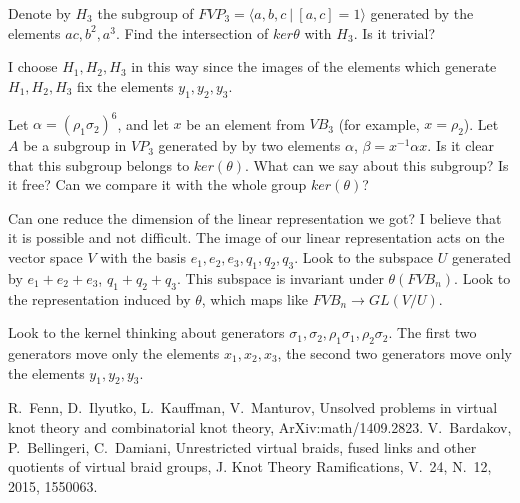 \documentclass{article}
\begin{document}
Denote by $H_3$ the subgroup of $FVP_3=\langle a,b,c~|~[a,c]=1\rangle$ generated by the elements $ac,b^2,a^3$. Find the intersection of $ker{\theta}$ with $H_3$. Is it trivial?

I choose $H_1,H_2,H_3$ in this way since the images of the elements which generate $H_1,H_2,H_3$ fix the elements $y_1,y_2,y_3$. 

Let $\alpha=(\rho_1\sigma_2)^6$, and let $x$ be an element from $VB_3$ (for example, $x=\rho_2$). Let $A$ be a subgroup in $VP_3$ generated by by two elements $\alpha$, $\beta=x^{-1}\alpha x$. Is it clear that this subgroup belongs to $ker(\theta)$. What can we say about this subgroup? Is it free? Can we compare it with the whole group $ker(\theta)$?

Can one reduce the dimension of the linear representation we got? I believe that it is possible and not difficult. The image of our linear representation acts on the vector space $V$ with the basis $e_1,e_2,e_3,q_1,q_2,q_3$. Look to the subspace $U$ generated by $e_1+e_2+e_3$, $q_1+q_2+q_3$. This subspace is invariant under $\theta(FVB_n)$. Look to the representation induced by $\theta$, which maps like $FVB_n\to GL(V/U)$.

Look to the kernel thinking about generators $\sigma_1, \sigma_2, \rho_1\sigma_1,\rho_2\sigma_2$. The first two generators move only the elements $x_1,x_2,x_3$, the second two generators move only the elements $y_1,y_2,y_3$.

\begin{thebibliography}{00}
R.~Fenn, D.~Ilyutko, L.~Kauffman, V.~Manturov, Unsolved problems in virtual knot theory and combinatorial knot theory, ArXiv:math/1409.2823.
V.~Bardakov, P.~Bellingeri, C.~Damiani, Unrestricted virtual braids, fused links and other quotients of virtual braid groups, J. Knot Theory Ramifications, V.~24, N.~12, 2015, 1550063.
\end{thebibliography}
\end{document}
